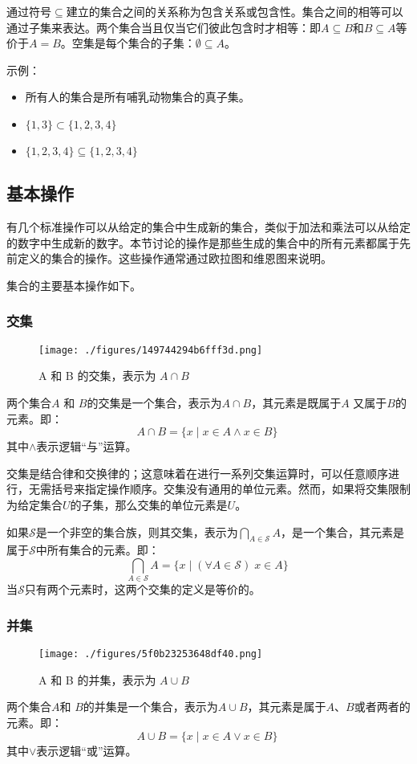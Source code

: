 通过符号\( \subseteq \)建立的集合之间的关系称为包含关系或包含性。集合之间的相等可以通过子集来表达。两个集合当且仅当它们彼此包含时才相等：即\( A \subseteq B \)和\( B \subseteq A \)等价于\( A = B \)。空集是每个集合的子集：\( \emptyset \subseteq A \)。

示例：
\begin{itemize}
\item 所有人的集合是所有哺乳动物集合的真子集。
\item \( \{1, 3\} \subset \{1, 2, 3, 4\} \)
\item \( \{1, 2, 3, 4\} \subseteq \{1, 2, 3, 4\} \)
\end{itemize}
\subsection{基本操作}
有几个标准操作可以从给定的集合中生成新的集合，类似于加法和乘法可以从给定的数字中生成新的数字。本节讨论的操作是那些生成的集合中的所有元素都属于先前定义的集合的操作。这些操作通常通过欧拉图和维恩图来说明。

集合的主要基本操作如下。
\subsubsection{交集}
\begin{figure}[ht]
\centering
\texttt{[image: ./figures/149744294b6fff3d.png]}
\caption{A 和 B 的交集，表示为 \( A \cap B \)} \label{fig_JHSX_4}
\end{figure}
两个集合\( A \) 和 \( B \)的交集是一个集合，表示为\( A \cap B \)，其元素是既属于\( A \) 又属于\( B \)的元素。即：
\[
A \cap B = \{x \mid x \in A \land x \in B\}~
\]
其中\( \land \)表示逻辑“与”运算。

交集是结合律和交换律的；这意味着在进行一系列交集运算时，可以任意顺序进行，无需括号来指定操作顺序。交集没有通用的单位元素。然而，如果将交集限制为给定集合\( U \)的子集，那么交集的单位元素是\( U \)。

如果\( \mathcal{S} \)是一个非空的集合族，则其交集，表示为\( \bigcap_{A \in \mathcal{S}} A \)，是一个集合，其元素是属于\( \mathcal{S} \)中所有集合的元素。即：
\[
\bigcap_{A \in \mathcal{S}} A = \{x \mid (\forall A \in \mathcal{S})\; x \in A\}~
\]
当\( \mathcal{S} \)只有两个元素时，这两个交集的定义是等价的。
\subsubsection{并集}
\begin{figure}[ht]
\centering
\texttt{[image: ./figures/5f0b23253648df40.png]}
\caption{A 和 B 的并集，表示为 \( A \cup B \)} \label{fig_JHSX_5}
\end{figure}
两个集合\( A \)和 \( B \)的并集是一个集合，表示为\( A \cup B \)，其元素是属于\( A \)、\( B \)或者两者的元素。即：
\[
A \cup B = \{x \mid x \in A \lor x \in B\}~
\]
其中\( \lor \)表示逻辑“或”运算。

